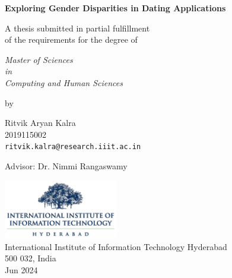 \thispagestyle{empty}
\begin{center}
\vspace*{1.5cm}
{\Large \bf Exploring Gender Disparities in Dating Applications}

\vspace*{2.2cm}
{\large A thesis submitted in partial fulfillment\\}
{\large  of the requirements for the degree of \\}

\vspace*{1cm}
{\it {\large  Master of Sciences} \\
{\large in\\}
{\large Computing and Human Sciences\\}}

\vspace*{0.8cm}
{\large by}

\vspace*{6mm}
{\large Ritvik Aryan Kalra\\}
{\large 2019115002\\
{\small \tt ritvik.kalra@research.iiit.ac.in}}

\vspace*{5mm}
{\large Advisor: Dr. Nimmi Rangaswamy\\}


\vspace*{3.0cm}
{\includegraphics[width=5cm]{figures/iiit.png}\\}
{\large International Institute of Information Technology Hyderabad\\}
{\large 500 032, India\\}
\vspace*{5mm}
{\large Jun 2024\\}
\end{center}